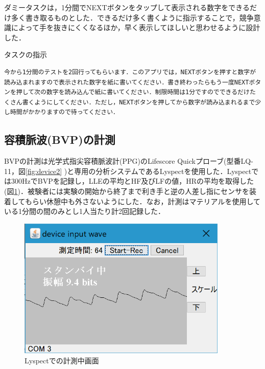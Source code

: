 ダミータスクは，1分間でNEXTボタンをタップして表示される数字をできるだけ多く書き取るものとした．できるだけ多く書くように指示することで，競争意識によって手を抜きにくくなるほか，早く表示してほしいと思わせるように設計した．

\begin{itembox}[l]{タスクの指示}
\begin{verbatim}
今から1分間のテストを2回行ってもらいます．このアプリでは，NEXTボタンを押すと数字が読み込まれますので表示された数字を紙に書いてください．書き終わったらもう一度NEXTボタンを押して次の数字を読み込んで紙に書いてください．制限時間は1分ですのでできるだけたくさん書くようにしてください．ただし，NEXTボタンを押してから数字が読み込まれるまで少し時間がかかりますので待ってください．
\end{verbatim}
\end{itembox}

\subsection{容積脈波(BVP)の計測}
BVPの計測は光学式指尖容積脈波計(PPG)のLifescore Quickプローブ(型番LQ-11，図\ref{fig:device2} )と専用の分析システムであるLyspect\cite{chaotechlyspect}を使用した．Lyspectでは300HzでBVPを記録し，LLEの平均とHF及びLFの値，HRの平均を取得した(図\ref{fig:lyspect})．被験者には実験の開始から終了まで利き手と逆の人差し指にセンサを装着してもらい休憩中も外さないようにした．なお，計測はマテリアルを使用している1分間の間のみとし1人当たり計2回記録した．

\begin{figure}[htbp]
  \begin{minipage}{\hsize}
    \begin{center}
       \includegraphics[width=100mm]{img/inputwave}
    \end{center}
    \caption{Lyspectでの計測中画面}
    \label{fig:lyspect}
  \end{minipage}
\end{figure}

